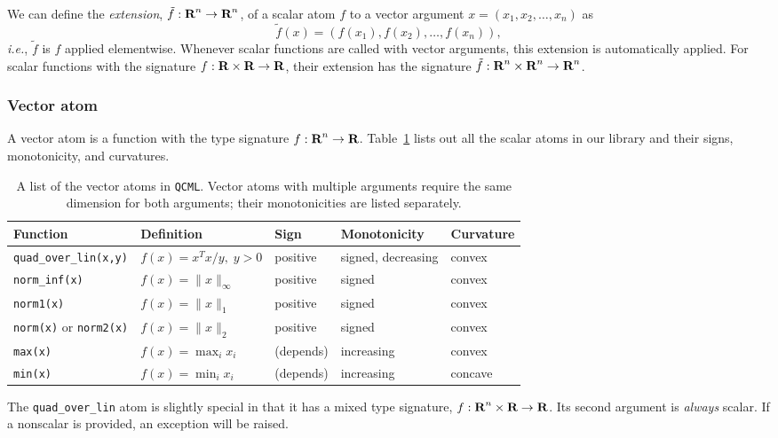 \documentclass[11pt]{article}
\def\qcml{\texttt{QCML}\xspace}
\newcommand{\ie}{{\it i.e.}}
\newcommand{\reals}{{\mbox{\bf R}}}
\begin{document}
We can define the \emph{extension}, $\tilde f : \reals^n \to \reals^n$, 
of a scalar atom $f$ to a vector argument $x = (x_1, x_2, \ldots, x_n)$ as
\[
\tilde f(x) = \left( f(x_1), f(x_2), \ldots, f(x_n) \right),
\]
\ie, $\tilde f$ is $f$ applied elementwise.
Whenever scalar functions are called with vector arguments, this extension
is automatically applied. For scalar functions with the signature 
$f : \reals \times \reals \to \reals$, their extension has the signature
$\tilde f : \reals^n \times \reals^n \to \reals^n$.

\subsubsection{Vector atom}
A vector atom is a function with the type signature $f : \reals^n \to \reals$.
Table~\ref{t-vector-atoms} lists out all the scalar atoms in our library
and their signs, monotonicity, and curvatures.

\begin{table}
  \centering
  \small
  \renewcommand{\arraystretch}{1.5}
  \centering
\begin{tabular}{|l|l||l|l|l|} \hline
  Function & Definition & Sign & Monotonicity & Curvature \\ \hline
  {\tt quad\_over\_lin(x,y)} & $f(x) = x^Tx/y, \; y >0$ & positive & signed, decreasing & convex \\ \hline
  {\tt norm\_inf(x)} & $f(x) = \|x\|_\infty$ & positive & signed & convex \\ \hline
  {\tt norm1(x)} & $f(x) = \|x\|_1$ & positive & signed & convex \\ \hline
  {\tt norm(x)} or {\tt norm2(x)} & $f(x) = \|x\|_2$ & positive & signed & convex \\ \hline
  {\tt max(x)} & $f(x) = \max_i x_i$ & (depends) & increasing & convex \\ \hline
  {\tt min(x)} & $f(x) = \min_i x_i$ & (depends) & increasing & concave \\ \hline
\end{tabular}
\caption{A list of the vector atoms in \qcml. Vector atoms with multiple arguments
require the same dimension for both arguments; their monotonicities are listed separately.}
\label{t-vector-atoms}
\end{table}

The {\tt quad\_over\_lin} atom is slightly special in that it has a mixed
type signature, $f : \reals^n \times \reals \to \reals$. Its second argument
is \emph{always} scalar. If a nonscalar is provided, an exception will be
raised.
\end{document}
